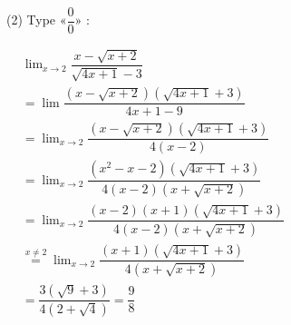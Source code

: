 {\begin{tasks}
\task*(2) Type $« \dfrac{0}{0} »$ :  

\(
\begin{aligned}
&\lim_{x \to 2} \dfrac{x - \sqrt{x + 2}}{\sqrt{4x + 1} - 3}\\
&= \lim \dfrac{(x - \sqrt{x + 2})(\sqrt{4x + 1} + 3)}{4x + 1 - 9} \\
&= \lim_{x\to 2} \dfrac{(x - \sqrt{x + 2})(\sqrt{4x + 1} + 3)}{4(x - 2)} \\
&=\lim_{x\to 2} \dfrac{(x^2-x-2)(\sqrt{4x+1}+3)}{4(x-2)(x+\sqrt{x+2})}\\
&=\lim_{x\to 2} \dfrac{(x-2)(x+1)(\sqrt{4x+1}+3)}{4(x-2)(x+\sqrt{x+2})}\\
&\stackrel{x\neq 2}{=}\lim_{x\to 2} \dfrac{(x+1)(\sqrt{4x+1}+3)}{4(x+\sqrt{x+2})}\\
&=\dfrac{3(\sqrt{9}+3)}{4(2+\sqrt{4})}=\dfrac{9}{8}
\end{aligned}
\)
\end{tasks}
}

